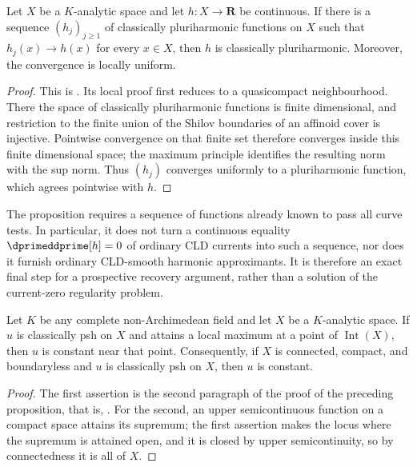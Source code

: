 \begin{proposition}
\label{prop:ch15-pointwise-pluriharmonic-closure}
Let $X$ be a $K$-analytic space and let $h:X\to\mathbf R$ be continuous.
If there is a sequence $(h_j)_{j\geq1}$ of classically pluriharmonic
functions on $X$ such that $h_j(x)\to h(x)$ for every $x\in X$, then $h$ is
classically pluriharmonic.  Moreover, the convergence is locally uniform.
\end{proposition}
\begin{proof}
This is \cite[Theorem~7.6]{GR25Classical}.  Its local proof first reduces to
a quasicompact neighbourhood.  There the space of classically
pluriharmonic functions is finite dimensional, and restriction to the finite
union of the Shilov boundaries of an affinoid cover is injective.  Pointwise
convergence on that finite set therefore converges inside this finite
dimensional space; the maximum principle identifies the resulting norm with
the sup norm.  Thus $(h_j)$ converges uniformly to a pluriharmonic function,
which agrees pointwise with $h$.
\end{proof}

\begin{remark}
\label{rem:ch15-pointwise-ph-boundary}
The proposition requires a sequence of functions already known to pass all
curve tests.  In particular, it does not turn a continuous equality
$\dprimeddprime[h]=0$ of ordinary CLD currents into such a sequence, nor
does it furnish ordinary CLD-smooth harmonic approximants.  It is therefore
an exact final step for a prospective recovery argument, rather than a
solution of the current-zero regularity problem.
\end{remark}

\begin{corollary}
\label{cor:ch15-gr-maximum}
Let $K$ be any complete non-Archimedean field and let $X$ be a
$K$-analytic space.  If $u$ is classically psh on $X$ and
attains a local maximum at a point of $\operatorname{Int}(X)$, then $u$ is
constant near that point.  Consequently, if $X$ is connected, compact, and
boundaryless and $u$ is classically
psh on $X$, then $u$ is constant.
\end{corollary}

\begin{proof}
The first assertion is the second paragraph of the proof of the preceding
proposition, that is, \cite[Theorems~5.4 and 6.1]{GR25Classical}.  For the
second, an upper semicontinuous function on a compact space attains its
supremum; the first assertion makes the locus where the supremum is attained
open, and it is closed by upper semicontinuity, so by connectedness it is all
of $X$.
\end{proof}


